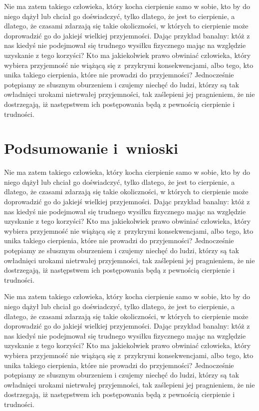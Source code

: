 \documentclass[12pt]{mwbk}
\theoremstyle{plain}
\theoremstyle{definition}
\theoremstyle{remark}
\begin{document}
Nie ma zatem takiego człowieka, który kocha cierpienie samo w sobie, 
kto by do niego dążył lub chciał go doświadczyć, tylko dlatego, że
jest to cierpienie, a dlatego, że czasami zdarzają się takie 
okoliczności, w których to cierpienie może doprowadzić 
go do jakiejś wielkiej przyjemności. 
Dając przykład banalny: któż z nas kiedyś nie podejmował 
się trudnego wysiłku fizycznego mając na względzie 
uzyskanie z tego korzyści? 
Kto ma jakiekolwiek prawo obwiniać człowieka, 
który wybiera przyjemność nie wiążącą się z~przykrymi 
konsekwencjami, albo tego, kto unika takiego cierpienia, 
które nie prowadzi do przyjemności? 
Jednocześnie potępiamy ze słusznym oburzeniem i czujemy 
niechęć do ludzi, którzy są tak owładnięci urokami nietrwałej 
przyjemności, tak zaślepieni jej pragnieniem, 
że nie dostrzegają, iż następstwem ich 
postępowania będą z pewnością cierpienie i trudności.



\chapter*{Podsumowanie i~wnioski}

Nie ma zatem takiego człowieka, który kocha cierpienie samo w sobie, 
kto by do niego dążył lub chciał go doświadczyć, tylko dlatego, że
jest to cierpienie, a dlatego, że czasami zdarzają się takie 
okoliczności, w których to cierpienie może doprowadzić 
go do jakiejś wielkiej przyjemności. 
Dając przykład banalny: któż z nas kiedyś nie podejmował 
się trudnego wysiłku fizycznego mając na względzie 
uzyskanie z tego korzyści? 
Kto ma jakiekolwiek prawo obwiniać człowieka, 
który wybiera przyjemność nie wiążącą się z~przykrymi 
konsekwencjami, albo tego, kto unika takiego cierpienia, 
które nie prowadzi do przyjemności? 
Jednocześnie potępiamy ze słusznym oburzeniem i czujemy 
niechęć do ludzi, którzy są tak owładnięci urokami nietrwałej 
przyjemności, tak zaślepieni jej pragnieniem, 
że nie dostrzegają, iż następstwem ich 
postępowania będą z pewnością cierpienie i trudności.

Nie ma zatem takiego człowieka, który kocha cierpienie samo w sobie, 
kto by do niego dążył lub chciał go doświadczyć, tylko dlatego, że
jest to cierpienie, a dlatego, że czasami zdarzają się takie 
okoliczności, w których to cierpienie może doprowadzić 
go do jakiejś wielkiej przyjemności. 
Dając przykład banalny: któż z nas kiedyś nie podejmował 
się trudnego wysiłku fizycznego mając na względzie 
uzyskanie z tego korzyści? 
Kto ma jakiekolwiek prawo obwiniać człowieka, 
który wybiera przyjemność nie wiążącą się z~przykrymi 
konsekwencjami, albo tego, kto unika takiego cierpienia, 
które nie prowadzi do przyjemności? 
Jednocześnie potępiamy ze słusznym oburzeniem i czujemy 
niechęć do ludzi, którzy są tak owładnięci urokami nietrwałej 
przyjemności, tak zaślepieni jej pragnieniem, 
że nie dostrzegają, iż następstwem ich 
postępowania będą z pewnością cierpienie i trudności.
\end{document}
